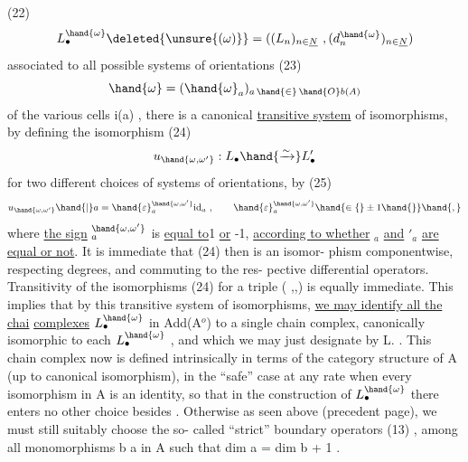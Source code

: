 
(22) \[ L_\bullet^{\hand{\omega}}\deleted{\unsure{(\omega)}} = ((L_n)_{n\in\underline{N}} \ , (d_n^{\hand{\omega}})_{n\in\underline{N}} ) \]
associated to  all possible systems of orientations
(23) \[ \hand{\omega} = (\hand{\omega}_a)_{a\, \hand{\in}\, \hand{O}b(A)} \]
of the various cells  i(a)  ,  there is a canonical \uline{transitive system}
of isomorphisms,  by defining the isomorphism
(24) \[ u_{\hand{\omega,\omega'}} : L_\bullet \hand{\xrightarrow{\sim}} L_\bullet' \]
for two different choices  of systems of orientations,  by
(25) \[ u_{\hand{\omega,\omega'}} \hand{\mid} a = \hand{\varepsilon}_a^{\hand{\omega,\omega'}} \mathrm{id}_a \ , \qquad \hand{\varepsilon}_a^{\hand{\omega,\omega'}} \hand{\in\{} \pm 1\hand{\}}\hand{,} \]
where  \uline{the sign}  \hand{$\varepsilon$}$_a^{\hand{\omega,\omega'}}$ is  \uline{equal to}\hand{+}1 \uline{or} -1,  \uline{according to whether}  \hand{$\omega$}$_a$  \uline{and}
\hand{$\omega$}$'_a$  \uline{are equal or not}.  It is immediate that  (24)  then is an isomor-%
phism componentwise,  respecting degrees,  and commuting to the res-%
pective differential  operators.  Transitivity of the isomorphisms
(24) for a triple  (\hand{$\omega$} ,,)  is equally immediate.  This implies that
by this transitive system of isomorphisms,  \uline{we may identify all the chai}
\uline{complexes}  $L_\bullet^{\hand{\omega}}$  in Add(A$^{o}$) to a single chain complex,  canonically 
isomorphic to each $L_\bullet^{\hand{\omega}}$ ,  and which we may just designate by L. .  This
chain complex now is defined intrinsically in terms of the category
structure of A (up to canonical isomorphism),  in the ``safe'' case at
any rate when every isomorphism in A is an identity,  so that in the
construction of $L_\bullet^{\hand{\omega}}$ there enters no other choice besides \hand{$\omega$}.  Otherwise\unsure{,}
as seen above (precedent page),  we must still suitably choose the so-%
called ``strict'' boundary operators  (13) ,  among all monomorphisms
b \hand{$\hookrightarrow$} a  in A such that  dim a = dim b + 1 .

